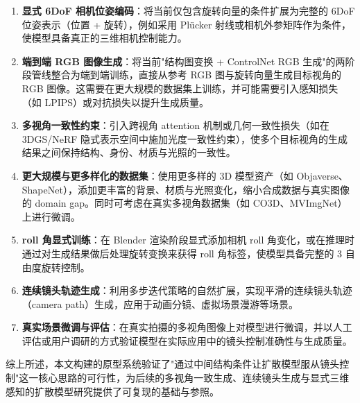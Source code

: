 \begin{enumerate}[label=(\arabic*)]
    \item \textbf{显式 6DoF 相机位姿编码}：将当前仅包含旋转向量的条件扩展为完整的 6DoF 位姿表示（位置 + 旋转），例如采用 Plücker 射线或相机外参矩阵作为条件，使模型具备真正的三维相机控制能力。
    
    \item \textbf{端到端 RGB 图像生成}：将当前"结构图变换 + ControlNet RGB 生成"的两阶段管线整合为端到端训练，直接从参考 RGB 图与旋转向量生成目标视角的 RGB 图像。这需要在更大规模的数据集上训练，并可能需要引入感知损失（如 LPIPS）或对抗损失以提升生成质量。
    
    \item \textbf{多视角一致性约束}：引入跨视角 attention 机制或几何一致性损失（如在 3DGS/NeRF 隐式表示空间中施加光度一致性约束），使多个目标视角的生成结果之间保持结构、身份、材质与光照的一致性。
    
    \item \textbf{更大规模与更多样化的数据集}：使用更多样的 3D 模型资产（如 Objaverse、ShapeNet），添加更丰富的背景、材质与光照变化，缩小合成数据与真实图像的 domain gap。同时可考虑在真实多视角数据集（如 CO3D、MVImgNet）上进行微调。
    
    \item \textbf{roll 角显式训练}：在 Blender 渲染阶段显式添加相机 roll 角变化，或在推理时通过对生成结果做后处理旋转变换来获得 roll 角标签，使模型具备完整的 3 自由度旋转控制。
    
    \item \textbf{连续镜头轨迹生成}：利用多步迭代策略的自然扩展，实现平滑的连续镜头轨迹（camera path）生成，应用于动画分镜、虚拟场景漫游等场景。
    
    \item \textbf{真实场景微调与评估}：在真实拍摄的多视角图像上对模型进行微调，并以人工评估或用户调研的方式验证模型在实际应用中的镜头控制准确性与生成质量。
\end{enumerate}

综上所述，本文构建的原型系统验证了"通过中间结构条件让扩散模型服从镜头控制"这一核心思路的可行性，为后续的多视角一致生成、连续镜头生成与显式三维感知的扩散模型研究提供了可复现的基础与参照。
